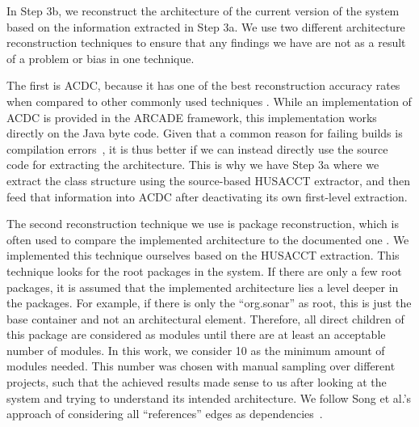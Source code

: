 \documentclass[sigconf, anonymous, review]{acmart}
\begin{document}
In Step 3b, we reconstruct the architecture of the current version of the system based on the information extracted in Step 3a. We use two different architecture reconstruction techniques to ensure that any findings we have are not as a result of a problem or bias in one technique.

The first is ACDC, because it has one of the best reconstruction accuracy rates when compared to other commonly used techniques \cite{arcRec-comparison}. 
While an implementation of ACDC is provided in the ARCADE framework, this implementation works directly on the Java byte code.  Given that a common reason for failing builds is compilation errors~\cite{CIFailTypes}, it is thus better if we can instead directly use the source code for extracting the architecture. This is why we have Step 3a where we extract the class structure using the source-based HUSACCT extractor, and then feed that information into ACDC after deactivating its own first-level extraction.

The second reconstruction technique we use is package reconstruction, which is often used to compare the implemented architecture to the documented one \cite{arcRec-comparison}. 
We implemented this technique ourselves based on the HUSACCT extraction.
This technique looks for the root packages in the system. If there are only a few root packages, it is assumed that the implemented architecture lies a level deeper in the packages. For example, if there is only the ``org.sonar'' as root, this is just the base container and not an architectural element. Therefore, all direct children of this package are considered as modules until there are at least an acceptable number of modules. In this work, we consider 10 as the minimum amount of modules needed. This number was chosen with manual sampling over different projects, such that the achieved results made sense to us after looking at the system and trying to understand its intended architecture. We follow Song et al.'s approach of considering all ``references'' edges as dependencies~\cite{ArcAsGraph}. 
\end{document}
